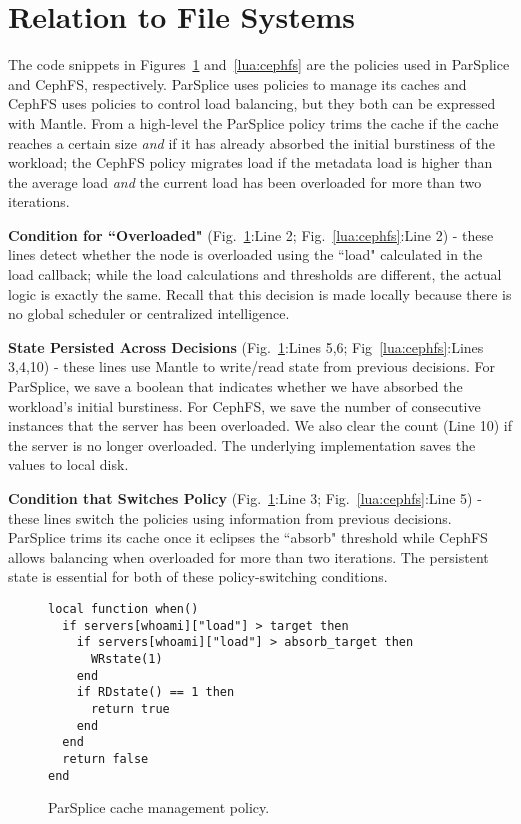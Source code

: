 \section{Relation to File Systems}
\label{sec:relation-to-file-systems}

The code snippets in Figures~\ref{lua:parsplice} and~\ref{lua:cephfs} are the
policies used in ParSplice and CephFS, respectively.  ParSplice uses policies
to manage its caches and CephFS uses policies to control load balancing, but
they both can be expressed with Mantle.  From a high-level the ParSplice policy
trims the cache if the cache reaches a certain size {\it and} if it has already
absorbed the initial burstiness of the workload; the CephFS policy migrates
load if the metadata load is higher than the average load {\it and} the current
load has been overloaded for more than two iterations.

\textbf{Condition for ``Overloaded"} (Fig.~\ref{lua:parsplice}:Line 2;
Fig.~\ref{lua:cephfs}:Line 2) - these lines detect whether the node is
overloaded using the ``load" calculated in the load callback; while the load
calculations and thresholds are different, the actual logic is exactly the
same.  Recall that this decision is made locally because there is no global
scheduler or centralized intelligence. 

\textbf{State Persisted Across Decisions} (Fig.~\ref{lua:parsplice}:Lines 5,6;
Fig~\ref{lua:cephfs}:Lines 3,4,10) - these lines use Mantle to write/read state
from previous decisions.  For ParSplice, we save a boolean that indicates
whether we have absorbed the workload's initial burstiness. For CephFS, we save
the number of consecutive instances that the server has been overloaded. We
also clear the count (Line 10) if the server is no longer overloaded. The
underlying implementation saves the values to local disk.

\textbf{Condition that Switches Policy} (Fig.~\ref{lua:parsplice}:Line 3;
Fig.~\ref{lua:cephfs}:Line 5) - these lines switch the policies using
information from previous decisions. ParSplice trims its cache once it eclipses
the ``absorb" threshold while CephFS allows balancing when overloaded for more
than two iterations. The persistent state is essential for both of these
policy-switching conditions.

\begin{figure}[tb]
\footnotesize
\begin{verbatim}
local function when()
  if servers[whoami]["load"] > target then
    if servers[whoami]["load"] > absorb_target then
      WRstate(1)
    end
    if RDstate() == 1 then
      return true
    end
  end
  return false
end
\end{verbatim}
\caption{ParSplice cache management policy.\label{lua:parsplice}}
\end{figure}

